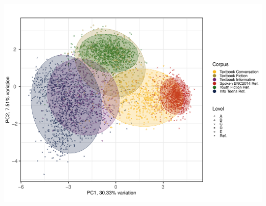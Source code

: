 \documentclass[
  letterpaper,
  DIV=11,
  numbers=noendperiod]{scrreprt}
\begin{document}
\includegraphics{AppendixH_files/figure-pdf/PCAtools-biplots-TxB-1.pdf}
\end{document}
